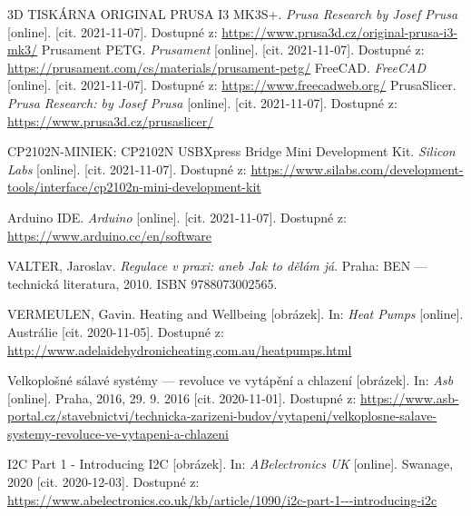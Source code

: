 \begin{thebibliography}{3}
3D TISKÁRNA ORIGINAL PRUSA I3 MK3S+. \textit{Prusa Research by Josef Prusa} [online]. [cit. 2021-11-07]. Dostupné z:  \url{https://www.prusa3d.cz/original-prusa-i3-mk3/}
Prusament PETG. \textit{Prusament} [online]. [cit. 2021-11-07]. Dostupné z: \url{https://prusament.com/cs/materials/prusament-petg/}
FreeCAD. \textit{FreeCAD} [online]. [cit. 2021-11-07]. Dostupné z: \url{https://www.freecadweb.org/}
PrusaSlicer. \textit{Prusa Research: by Josef Prusa} [online]. [cit. 2021-11-07]. Dostupné z: \url{https://www.prusa3d.cz/prusaslicer/}

CP2102N-MINIEK: CP2102N USBXpress Bridge Mini Development Kit. \textit{Silicon Labs} [online]. [cit. 2021-11-07]. Dostupné z: \url{https://www.silabs.com/development-tools/interface/cp2102n-mini-development-kit}

Arduino IDE. \textit{Arduino} [online]. [cit. 2021-11-07]. Dostupné z: \url{https://www.arduino.cc/en/software}

VALTER, Jaroslav. \textit{Regulace v praxi: aneb Jak to dělám já}. Praha: BEN --- technická literatura, 2010. ISBN 9788073002565.


VERMEULEN, Gavin. Heating and Wellbeing [obrázek]. In: \textit{Heat Pumps} [online]. Austrálie [cit. 2020-11-05]. Dostupné z: \url{http://www.adelaidehydronicheating.com.au/heatpumps.html}

Velkoplošné sálavé systémy --- revoluce ve vytápění a chlazení [obrázek]. In: \textit{Asb} [online]. Praha, 2016, 29. 9. 2016 [cit. 2020-11-01]. Dostupné z: \url{https://www.asb-portal.cz/stavebnictvi/technicka-zarizeni-budov/vytapeni/velkoplosne-salave-systemy-revoluce-ve-vytapeni-a-chlazeni}



I2C Part 1 - Introducing I2C [obrázek]. In: \textit{ABelectronics UK} [online]. Swanage, 2020 [cit. 2020-12-03]. Dostupné z: \url{https://www.abelectronics.co.uk/kb/article/1090/i2c-part-1---introducing-i2c}


\end{thebibliography}
